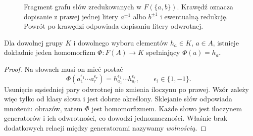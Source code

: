 \begin{figure}[htbp]
\centering
{}
\caption{Fragment grafu słów zredukowanych w
$F(\{a,b\})$. Krawędź oznacza dopisanie
z prawej jednej litery $a^{\pm1}$ albo $b^{\pm1}$
i ewentualną redukcję. Powrót po krawędzi
odpowiada dopisaniu litery odwrotnej.}
\label{fig:free-words-5}
\end{figure}

\begin{stwierdzenie}
\label{prop:free-universal-5}
Dla dowolnej grupy $K$ i dowolnego wyboru
elementów $h_a\in K$, $a\in A$, istnieje
dokładnie jeden homomorfizm $\Phi:F(A)\to K$
spełniający $\Phi(a)=h_a$.
\end{stwierdzenie}
\begin{proof}
Na słowach musi on mieć postać
\[
 \Phi(a_1^{\epsilon_1}\cdots a_r^{\epsilon_r})
 =h_{a_1}^{\epsilon_1}\cdots h_{a_r}^{\epsilon_r},
 \qquad \epsilon_i\in\{1,-1\}.
\]
Usunięcie sąsiedniej pary odwrotnej nie zmienia
iloczynu po prawej. Wzór zależy więc tylko
od klasy słowa i jest dobrze określony.
Sklejanie słów odpowiada mnożeniu obrazów,
zatem $\Phi$ jest homomorfizmem.
Każde słowo jest iloczynem generatorów
i ich odwrotności, co dowodzi jednoznaczności.
Właśnie brak dodatkowych relacji między
generatorami nazywamy \emph{wolnością}.
\end{proof}


